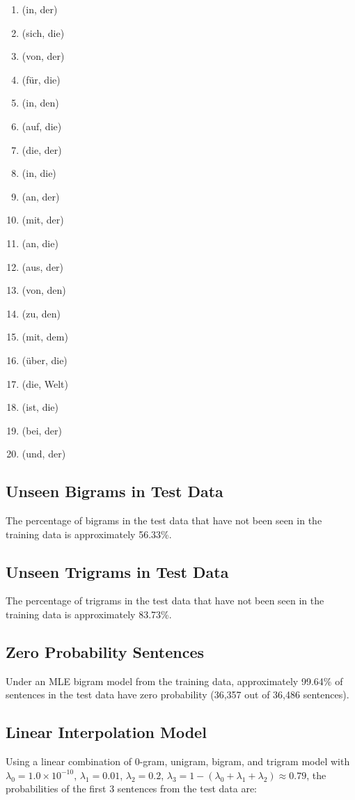 \documentclass[a4paper,margin=1cm]{article}
\begin{document}
\begin{enumerate}
\item (in, der)
\item (sich, die)
\item (von, der)
\item (für, die)
\item (in, den)
\item (auf, die)
\item (die, der)
\item (in, die)
\item (an, der)
\item (mit, der)
\item (an, die)
\item (aus, der)
\item (von, den)
\item (zu, den)
\item (mit, dem)
\item (über, die)
\item (die, Welt)
\item (ist, die)
\item (bei, der)
\item (und, der)
\end{enumerate}

\subsection{Unseen Bigrams in Test Data}
The percentage of bigrams in the test data that have not been seen in the training data is approximately 56.33\%.

\subsection{Unseen Trigrams in Test Data}
The percentage of trigrams in the test data that have not been seen in the training data is approximately 83.73\%.

\subsection{Zero Probability Sentences}
Under an MLE bigram model from the training data, approximately 99.64\% of sentences in the test data have zero probability (36,357 out of 36,486 sentences).

\subsection{Linear Interpolation Model}
Using a linear combination of 0-gram, unigram, bigram, and trigram model with $\lambda_0 = 1.0 \times 10^{-10}$, $\lambda_1 = 0.01$, $\lambda_2 = 0.2$, $\lambda_3 = 1-(\lambda_0+\lambda_1+\lambda_2) \approx 0.79$, the probabilities of the first 3 sentences from the test data are:
\end{document}
